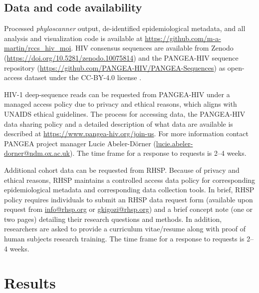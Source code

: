 \documentclass[10pt,letterpaper]{article}
\begin{document}
\subsection{Data and code availability}
 Processed \textit{phyloscanner} output, de-identified epidemiological metadata, and all analysis and visualization code is available at \href{https://github.com/m-a-martin/rccs_hiv_moi}{https://github.com/m-a-martin/rccs\_hiv\_moi}. 
HIV consensus sequences are available from Zenodo (\href{https://doi.org/10.5281/zenodo.10075814}{https://doi.org/10.5281/zenodo.10075814}) and the PANGEA-HIV sequence repository (\href{https://github.com/PANGEA-HIV/PANGEA-Sequences}{https://github.com/PANGEA-HIV/PANGEA-Sequences}) as open-access dataset under the CC-BY-4.0 license \cite{pangea}. \par
HIV-1 deep-sequence reads can be requested from PANGEA-HIV under a managed access policy due to privacy and ethical reasons, which aligns with UNAIDS ethical guidelines. The process for accessing data, the PANGEA-HIV data sharing policy and a detailed description of what data are available is described at \href{https://www.pangea-hiv.org/join-us}{https://www.pangea-hiv.org/join-us}. For more information contact PANGEA project manager Lucie Abeler-Dörner (\href{mailto:lucie.abeler-dorner@ndm.ox.ac.uk}{lucie.abeler-dorner@ndm.ox.ac.uk}). The time frame for a response to requests is 2–4 weeks. \par
Additional cohort data can be requested from RHSP. Because of privacy and ethical reasons, RHSP maintains a controlled access data policy for corresponding epidemiological metadata and corresponding data collection tools. In brief, RHSP policy requires individuals to submit an RHSP data request form (available upon request from \href{mailto:info@rhsp.org}{info@rhsp.org} or \href{mailto:gkigozi@rhsp.org}{gkigozi@rhsp.org}) and a brief concept note (one or two pages) detailing their research questions and methods. In addition, researchers are asked to provide a curriculum vitae/resume along with proof of human subjects research training. The time frame for a response to requests is 2–4 weeks.
\par

\section{Results}
\end{document}
